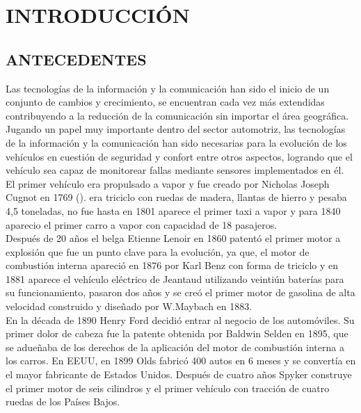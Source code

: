 \section{INTRODUCCIÓN}

\subsection{ANTECEDENTES}
Las tecnologías de la información y la comunicación han sido el inicio de un conjunto de cambios y crecimiento, se encuentran cada vez más extendidas contribuyendo a la reducción de la comunicación sin importar el área geográfica.\\

Jugando un papel muy importante dentro del sector automotriz, las tecnologías de la información y la comunicación han sido necesarias para la evolución de los vehículos en cuestión de seguridad y confort entre otros aspectos, logrando que el vehículo sea capaz de monitorear fallas mediante sensores implementados en él.\\

El primer vehículo era propulsado a vapor y fue creado por Nicholas Joseph Cugnot en 1769 (\cite{UPS-22,UPS-23}). era triciclo con ruedas de madera, llantas de hierro y pesaba 4,5 toneladas, no fue hasta en 1801 aparece el primer taxi a vapor y para 1840 aparecio el primer carro a vapor con capacidad de 18 pasajeros.\\

Después de 20 años el belga Etienne Lenoir en 1860 patentó el primer motor a explosión que fue un punto clave para la evolución, ya que, el motor de combustión interna apareció en 1876 por Karl Benz con forma de triciclo y en 1881 aparece el vehículo eléctrico de Jeantaud utilizando veintiún baterías para su funcionamiento, pasaron dos años y se creó el primer motor de gasolina de alta velocidad construido y diseñado por W.Maybach en 1883.\\ 

En la década de 1890 Henry Ford decidió entrar al negocio de los automóviles. Su primer dolor de cabeza fue la patente obtenida por Baldwin Selden en 1895, que se adueñaba de los derechos de la aplicación del motor de combustión interna a los carros. En EEUU, en 1899 Olds fabricó 400 autos en 6 meses y se convertía en el mayor fabricante de Estados Unidos. Después de cuatro años Spyker construye el primer motor de seis cilindros y el primer vehículo con tracción de cuatro ruedas de los Países Bajos.\\

